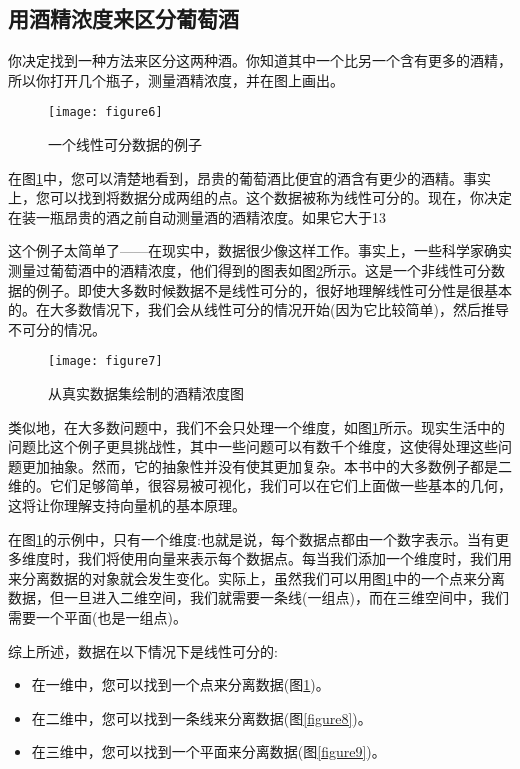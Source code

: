 \subsection{用酒精浓度来区分葡萄酒}

你决定找到一种方法来区分这两种酒。你知道其中一个比另一个含有更多的酒精，所以你打开几个瓶子，测量酒精浓度，并在图上画出。


\begin{figure}[ht]
    \centering
    \texttt{[image: figure6]}
    \caption{一个线性可分数据的例子}
    \label{figure6}
\end{figure}

在图\ref{figure6}中，您可以清楚地看到，昂贵的葡萄酒比便宜的酒含有更少的酒精。事实上，您可以找到将数据分成两组的点。这个数据被称为线性可分的。现在，你决定在装一瓶昂贵的酒之前自动测量酒的酒精浓度。如果它大于13%

这个例子太简单了——在现实中，数据很少像这样工作。事实上，一些科学家确实测量过葡萄酒中的酒精浓度，他们得到的图表如图\ref{figure7}所示。这是一个非线性可分数据的例子。即使大多数时候数据不是线性可分的，很好地理解线性可分性是很基本的。在大多数情况下，我们会从线性可分的情况开始(因为它比较简单)，然后推导不可分的情况。

\begin{figure}[ht]
    \centering
    \texttt{[image: figure7]}
    \caption{从真实数据集绘制的酒精浓度图}
    \label{figure7}
\end{figure}

类似地，在大多数问题中，我们不会只处理一个维度，如图\ref{figure6}所示。现实生活中的问题比这个例子更具挑战性，其中一些问题可以有数千个维度，这使得处理这些问题更加抽象。然而，它的抽象性并没有使其更加复杂。本书中的大多数例子都是二维的。它们足够简单，很容易被可视化，我们可以在它们上面做一些基本的几何，这将让你理解支持向量机的基本原理。

在图\ref{figure6}的示例中，只有一个维度:也就是说，每个数据点都由一个数字表示。当有更多维度时，我们将使用向量来表示每个数据点。每当我们添加一个维度时，我们用来分离数据的对象就会发生变化。实际上，虽然我们可以用图\ref{figure6}中的一个点来分离数据，但一旦进入二维空间，我们就需要一条线(一组点)，而在三维空间中，我们需要一个平面(也是一组点)。

综上所述，数据在以下情况下是线性可分的:
\begin{itemize}
    \item 在一维中，您可以找到一个点来分离数据(图\ref{figure6})。
    \item 在二维中，您可以找到一条线来分离数据(图\ref{figure8})。
    \item 在三维中，您可以找到一个平面来分离数据(图\ref{figure9})。
\end{itemize}


